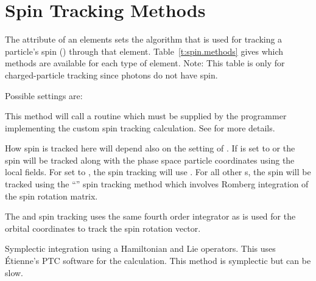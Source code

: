 \begin{table}[pth]
\label{t:mat6.methods}
\end{table}

\vfill \break

\section{Spin Tracking Methods}
\label{s:spin.methods}

The  attribute of an elements sets the algorithm that is used for tracking
a particle's spin () through that element.  Table~\ref{t:spin.methods} gives which
methods are available for each type of element. Note: This table is only for charged-particle tracking
since photons do not have spin.

Possible  settings are:
\begin{description}

\item[\vn{Custom}] \Newline
This method will call a routine  which must be supplied by the programmer
implementing the custom spin tracking calculation. See  for more details.

\item[\vn{Tracking}] \Newline
How spin is tracked here will depend also on the setting of . If
 is set to  or  the spin will be tracked
along with the phase space particle coordinates using the local fields. For  set
to , the spin tracking will use .  For all other s, the
spin will be tracked using the ``'' spin tracking method which involves Romberg
integration of the spin rotation matrix.

The  and  spin tracking uses the same fourth order integrator
as is used for the orbital coordinates to track the spin rotation vector.

\item[\vn{Symp_Lie_PTC}] \Newline
Symplectic integration using a Hamiltonian and Lie operators.  This uses \'Etienne's PTC software
for the calculation.  This method is symplectic but can be slow.

\end{description}

